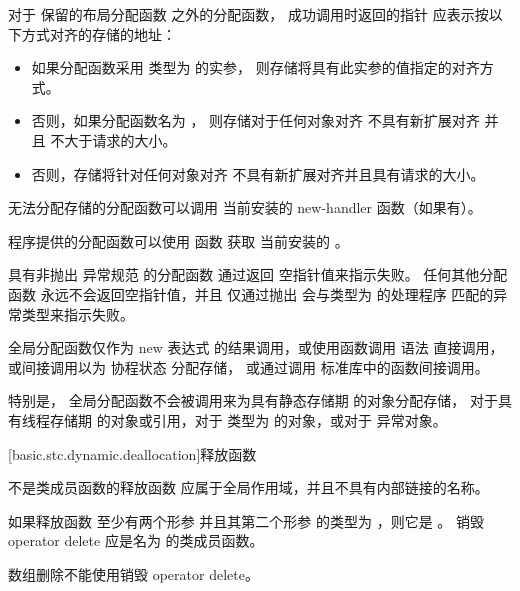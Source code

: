 \pnum
对于
保留的布局分配函数 之外的分配函数，
成功调用时返回的指针
应表示按以下方式对齐的存储的地址：
\begin{itemize}
\item
  如果分配函数采用
  类型为  的实参，
  则存储将具有此实参的值指定的对齐方式。
\item
  否则，如果分配函数名为 ，
  则存储对于任何对象对齐
  不具有新扩展对齐 并且
  不大于请求的大小。
\item
  否则，存储将针对任何对象对齐
  不具有新扩展对齐并且具有请求的大小。
\end{itemize}

\pnum
无法分配存储的分配函数可以调用
当前安装的 new-handler 函数（如果有）。
\begin{note}
%
程序提供的分配函数可以使用
 函数 获取
当前安装的 。
\end{note}
具有非抛出
异常规范 的分配函数
通过返回
空指针值来指示失败。
任何其他分配函数
永远不会返回空指针值，并且
仅通过抛出
会与类型为
 的处理程序 匹配的异常类型来指示失败。

\pnum
全局分配函数仅作为 new
表达式 的结果调用，或使用函数调用
语法 直接调用，或间接调用以为
协程状态 分配存储，
或通过调用
\Cpp{} 标准库中的函数间接调用。
\begin{note}
特别是，
全局分配函数不会被调用来为具有静态存储期 的对象分配存储，
对于具有线程存储期 的对象或引用，对于
类型为  的对象，或对于
异常对象。
\end{note}

[basic.stc.dynamic.deallocation]{释放函数}

\pnum
{}%
不是类成员函数的释放函数
应属于全局作用域，并且不具有内部链接的名称。

\pnum
如果释放函数
至少有两个形参
并且其第二个形参
的类型为 ，则它是 。
销毁 operator delete
应是名为  的类成员函数。
\begin{note}
数组删除不能使用销毁 operator delete。
\end{note}

